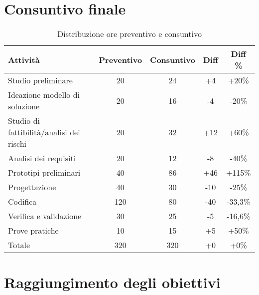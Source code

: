 \section{Consuntivo finale}
\begin{table}[H]
	\begin{center}
	  \begin{tabular}{| l | c | c | c | c |}
	    \hline
	    \textbf{Attività} & \textbf{Preventivo} & \textbf{Consuntivo} & \textbf{Diff} & \textbf{Diff \%} \\ \hline
	    Studio preliminare & 20 & 24 & +4 & +20\%\\
	    \hline
	    Ideazione modello di soluzione & 20 & 16 & -4 & -20\%\\
	    \hline
	    Studio di fattibilità/analisi dei rischi & 20 & 32 & +12 & +60\%\\
	    \hline
	    Analisi dei requisiti & 20 & 12 & -8 & -40\%\\
	    \hline
	    Prototipi preliminari & 40 & 86 & +46 & +115\%\\
	    \hline
	    Progettazione & 40 & 30 & -10 & -25\%\\
	    \hline
	    Codifica & 120 & 80 & -40 & -33,3\%\\
	    \hline
	    Verifica e validazione & 30 & 25 & -5 & -16,6\%\\
	    \hline
	    Prove pratiche & 10 & 15 & +5 & +50\%\\
	    \hline
	    Totale & 320 & 320 & +0 & +0\%\\
	    \hline
	  \end{tabular}
	\end{center}
	\caption{Distribuzione ore preventivo e consuntivo}
\end{table}

\section{Raggiungimento degli obiettivi}
